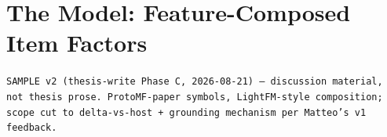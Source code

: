 \documentclass[11pt,a4paper]{article}
\begin{document}
\section*{The Model: Feature-Composed Item Factors}
{\scriptsize\color{gray}\texttt{SAMPLE v2 (thesis-write Phase C, 2026-08-21) — discussion material, not thesis prose. ProtoMF-paper symbols, LightFM-style composition; scope cut to delta-vs-host + grounding mechanism per Matteo's v1 feedback.}\par}
\vspace{1em}


\end{document}
